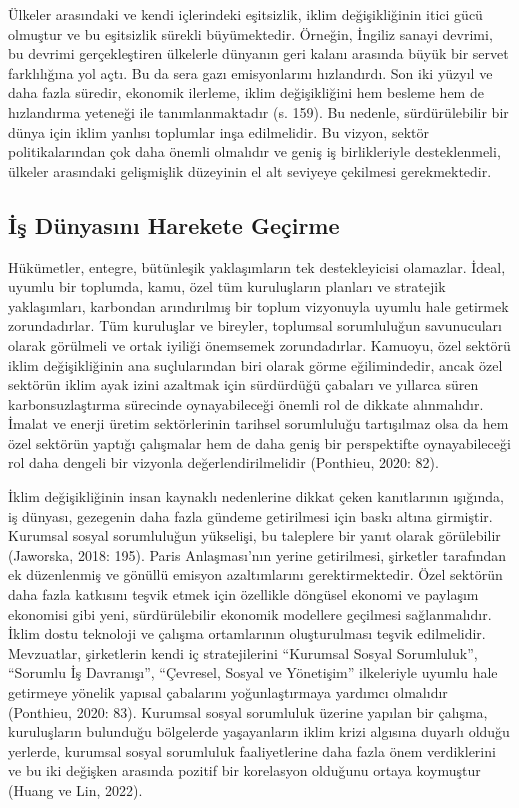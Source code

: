 \documentclass[
]{book}
\begin{document}
Ülkeler arasındaki ve kendi içlerindeki eşitsizlik, iklim değişikliğinin itici gücü olmuştur ve bu eşitsizlik sürekli büyümektedir. Örneğin, İngiliz sanayi devrimi, bu devrimi gerçekleştiren ülkelerle dünyanın geri kalanı arasında büyük bir servet farklılığına yol açtı. Bu da sera gazı emisyonlarını hızlandırdı. Son iki yüzyıl ve daha fazla süredir, ekonomik ilerleme, iklim değişikliğini hem besleme hem de hızlandırma yeteneği ile tanımlanmaktadır (s. 159). \citep{harvey2016climate} Bu nedenle, sürdürülebilir bir dünya için iklim yanlısı toplumlar inşa edilmelidir. Bu vizyon, sektör politikalarından çok daha önemli olmalıdır ve geniş iş birlikleriyle desteklenmeli, ülkeler arasındaki gelişmişlik düzeyinin el alt seviyeye çekilmesi gerekmektedir.

\hypertarget{iux15f-duxfcnyasux131nux131-harekete-geuxe7irme}{%
\subsection{İş Dünyasını Harekete Geçirme}\label{iux15f-duxfcnyasux131nux131-harekete-geuxe7irme}}

Hükümetler, entegre, bütünleşik yaklaşımların tek destekleyicisi olamazlar. İdeal, uyumlu bir toplumda, kamu, özel tüm kuruluşların planları ve stratejik yaklaşımları, karbondan arındırılmış bir toplum vizyonuyla uyumlu hale getirmek zorundadırlar. Tüm kuruluşlar ve bireyler, toplumsal sorumluluğun savunucuları olarak görülmeli ve ortak iyiliği önemsemek zorundadırlar. Kamuoyu, özel sektörü iklim değişikliğinin ana suçlularından biri olarak görme eğilimindedir, ancak özel sektörün iklim ayak izini azaltmak için sürdürdüğü çabaları ve yıllarca süren karbonsuzlaştırma sürecinde oynayabileceği önemli rol de dikkate alınmalıdır. İmalat ve enerji üretim sektörlerinin tarihsel sorumluluğu tartışılmaz olsa da hem özel sektörün yaptığı çalışmalar hem de daha geniş bir perspektifte oynayabileceği rol daha dengeli bir vizyonla değerlendirilmelidir (Ponthieu, 2020: 82).

İklim değişikliğinin insan kaynaklı nedenlerine dikkat çeken kanıtlarının ışığında, iş dünyası, gezegenin daha fazla gündeme getirilmesi için baskı altına girmiştir. Kurumsal sosyal sorumluluğun yükselişi, bu taleplere bir yanıt olarak görülebilir (Jaworska, 2018: 195). Paris Anlaşması'nın yerine getirilmesi, şirketler tarafından ek düzenlenmiş ve gönüllü emisyon azaltımlarını gerektirmektedir. Özel sektörün daha fazla katkısını teşvik etmek için özellikle döngüsel ekonomi ve paylaşım ekonomisi gibi yeni, sürdürülebilir ekonomik modellere geçilmesi sağlanmalıdır. İklim dostu teknoloji ve çalışma ortamlarının oluşturulması teşvik edilmelidir. Mevzuatlar, şirketlerin kendi iç stratejilerini ``Kurumsal Sosyal Sorumluluk'', ``Sorumlu İş Davranışı'', ``Çevresel, Sosyal ve Yönetişim'' ilkeleriyle uyumlu hale getirmeye yönelik yapısal çabalarını yoğunlaştırmaya yardımcı olmalıdır (Ponthieu, 2020: 83). Kurumsal sosyal sorumluluk üzerine yapılan bir çalışma, kuruluşların bulunduğu bölgelerde yaşayanların iklim krizi algısına duyarlı olduğu yerlerde, kurumsal sosyal sorumluluk faaliyetlerine daha fazla önem verdiklerini ve bu iki değişken arasında pozitif bir korelasyon olduğunu ortaya koymuştur (Huang ve Lin, 2022).
\end{document}
